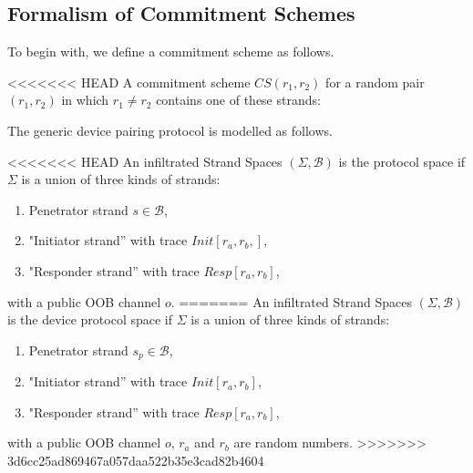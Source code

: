 \begin{itemize}
\subsection{Formalism of Commitment Schemes}

To begin with, we define a commitment scheme as follows. 
 
\begin{Definition}
<<<<<<< HEAD
A commitment scheme $CS(r_1,r_2)$ for a random pair $(r_1,r_2)$ in which $r_1 \not= r_2$ contains one of these strands:
\end{Definition}

The generic device pairing protocol is modelled as follows. 

\begin{Definition}
<<<<<<< HEAD
An infiltrated Strand Spaces $(\Sigma,\mathcal{B})$ is the protocol space if $\Sigma$ is a union of three kinds of strands:
\begin{enumerate}
\item Penetrator strand $s \in \mathcal{B}$,
\item "Initiator strand'' with trace {\small $Init[r_a,r_b,]$},
\item "Responder strand'' with trace {\small $Resp[r_a,r_b]$},
\end{enumerate}
with a public OOB channel $o$. 
=======
An infiltrated Strand Spaces $(\Sigma,\mathcal{B})$ is the device protocol space if $\Sigma$ is a union of three kinds of strands:
\begin{enumerate}
\item Penetrator strand $s_p \in \mathcal{B}$,
\item "Initiator strand'' with trace {\small $Init[r_a,r_b]$},
\item "Responder strand'' with trace {\small $Resp[r_a,r_b]$},
\end{enumerate}
with a public OOB channel $o$, $r_a$ and $r_b$ are random numbers. 
>>>>>>> 3d6cc25ad869467a057daa522b35e3cad82b4604
\end{Definition}


\end{itemize}
